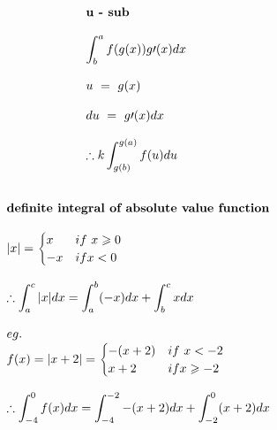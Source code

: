 \documentclass{article}
\begin{document}
\begin{multicols}{2}
    
    \[ 
    \begin{array}{>{\displaystyle}l}
        \textbf{u - sub}\\
        \\
        \int ^{a}_{b} f( g( x)) g\prime ( x) dx\ \\
        \\
        u\ =\ g( x)\\
        \\
        du\ =\ g\prime ( x) dx\\
        \\
        \therefore k \int ^{g( a)}_{g( b)} f( u) du\ \\
        \\
    \end{array}
    \]

    \columnbreak
    \vspace*{\fill}
    \[
    \begin{array}{>{\displaystyle}l}
        \textbf{definite integral of absolute value function}\\
        \\
        |x|=\begin{cases}
        x & if\ x\geqslant 0\\
        -x & ifx< 0
        \end{cases}\\
        \\
        \therefore \int ^{c}_{a} |x|dx=\int ^{b}_{a}( -x) dx+\int ^{c}_{b} xdx\\
        \\
        eg.\ \\
        f( x) =|x+2|=\begin{cases}
        -( x+2) & if\ x< -2\\
        x+2 & ifx\geqslant -2
        \end{cases}\\
        \\
        \therefore \int ^{0}_{-4} f( x) dx=\int ^{-2}_{-4} -( x+2) dx+\int ^{0}_{-2}( x+2) dx
    \end{array}
    \]
\end{multicols}


\newpage

   
\end{document}
